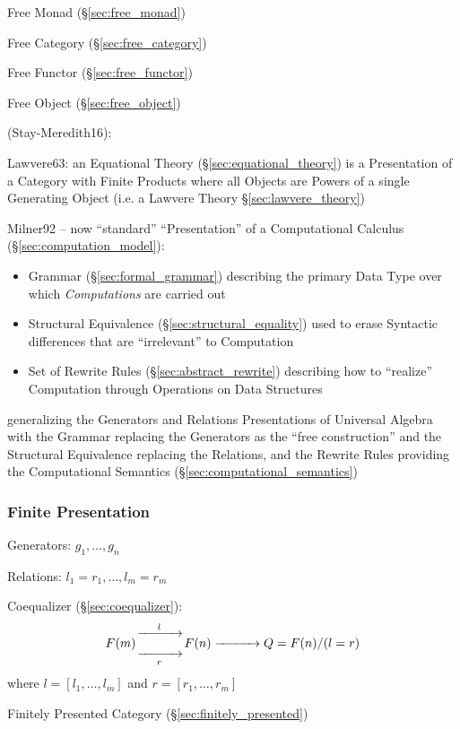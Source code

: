 Free Monad (\S\ref{sec:free_monad})

Free Category (\S\ref{sec:free_category})

Free Functor (\S\ref{sec:free_functor})

Free Object (\S\ref{sec:free_object})

\asterism

(Stay-Meredith16):

Lawvere63: an Equational Theory (\S\ref{sec:equational_theory}) is a
Presentation of a Category with Finite Products where all Objects are Powers of
a single Generating Object (i.e. a Lawvere Theory \S\ref{sec:lawvere_theory})

Milner92 \cite{milner92} -- now ``standard'' ``Presentation'' of a Computational
Calculus (\S\ref{sec:computation_model}):
\begin{itemize}
  \item Grammar (\S\ref{sec:formal_grammar}) describing the primary Data Type
    over which \emph{Computations} are carried out
  \item Structural Equivalence (\S\ref{sec:structural_equality}) used to erase
    Syntactic differences that are ``irrelevant'' to Computation
  \item Set of Rewrite Rules (\S\ref{sec:abstract_rewrite}) describing how to
    ``realize'' Computation through Operations on Data Structures
\end{itemize}
generalizing the Generators and Relations Presentations of Universal Algebra
with the Grammar replacing the Generators as the ``free construction'' and the
Structural Equivalence replacing the Relations, and the Rewrite Rules providing
the Computational Semantics (\S\ref{sec:computational_semantics})



\subsubsection{Finite Presentation}\label{sec:finite_presentation}
\cite{awodey06}

Generators: $g_1, \ldots, g_n$

Relations: $l_1 = r_1, \ldots, l_m = r_m$

Coequalizer (\S\ref{sec:coequalizer}):
\[
  F(m) {\xrightarrow[\quad\quad\quad]{l}
    \atop \xrightarrow[r]{\quad\quad\quad}} F(n)
  \xrightarrow{\quad\quad\quad} Q = F(n) / (l = r)
\]
where $l = [l_1, \ldots, l_m]$ and $r = [r_1, \ldots, r_m]$

Finitely Presented Category (\S\ref{sec:finitely_presented})

